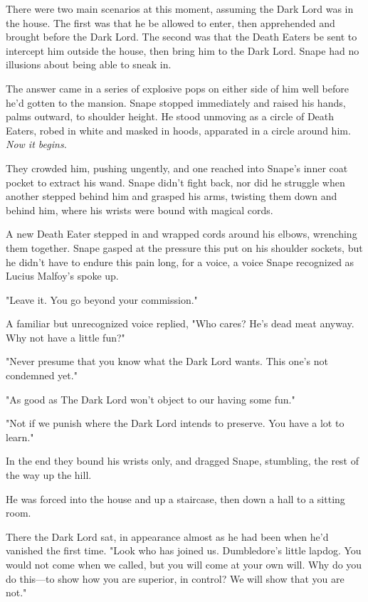 There were two main scenarios at this moment, assuming the Dark Lord was in the house. The first was that he be allowed to enter, then apprehended and brought before the Dark Lord. The second was that the Death Eaters be sent to intercept him outside the house, then bring him to the Dark Lord. Snape had no illusions about being able to sneak in.

The answer came in a series of explosive pops on either side of him well before he'd gotten to the mansion. Snape stopped immediately and raised his hands, palms outward, to shoulder height. He stood unmoving as a circle of Death Eaters, robed in white and masked in hoods, apparated in a circle around him. \emph{Now it begins.}

They crowded him, pushing ungently, and one reached into Snape's inner coat pocket to extract his wand. Snape didn't fight back, nor did he struggle when another stepped behind him and grasped his arms, twisting them down and behind him, where his wrists were bound with magical cords.

A new Death Eater stepped in and wrapped cords around his elbows, wrenching them together. Snape gasped at the pressure this put on his shoulder sockets, but he didn't have to endure this pain long, for a voice, a voice Snape recognized as Lucius Malfoy's spoke up.

"Leave it. You go beyond your commission."

A familiar but unrecognized voice replied, "Who cares? He's dead meat anyway. Why not have a little fun?"

"Never presume that you know what the Dark Lord wants. This one's not condemned yet."

"As good as{\el} The Dark Lord won't object to our having some fun."

"Not if we punish where the Dark Lord intends to preserve. You have a lot to learn."

In the end they bound his wrists only, and dragged Snape, stumbling, the rest of the way up the hill.

He was forced into the house and up a staircase, then down a hall to a sitting room.

There the Dark Lord sat, in appearance almost as he had been when he'd vanished the first time. "Look who has joined us. Dumbledore's little lapdog. You would not come when we called, but you will come at your own will. Why do you do this—to show how you are superior, in control? We will show that you are not."

